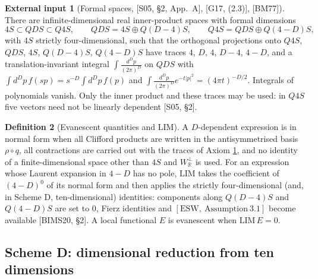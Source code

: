 \documentclass[11pt]{article}
\theoremstyle{definition}
\newtheorem{definition}{Definition}[section]
\newtheorem{axiom}[definition]{External input}
\numberwithin{equation}{section}
\begin{document}
\begin{axiom}[Formal spaces, {[S05, §2, App.~A], [G17, (2.3)], [BM77]}]
\label{ax:spaces}
There are infinite-dimensional real inner-product spaces with formal dimensions
\[
4S\subset QDS\subset Q4S,\qquad QDS=4S\oplus Q(D{-}4)S,\qquad Q4S=QDS\oplus Q(4{-}D)S,
\]
with $4S$ strictly four-dimensional, such that the orthogonal projections onto $Q4S$, $QDS$, $4S$, $Q(D{-}4)S$, $Q(4{-}D)S$ have traces $4$, $D$, $4$, $D-4$, $4-D$, and a translation-invariant integral $\int\frac{d^Dp}{(2\pi)^D}$ on $QDS$ with $\int d^Dp\,f(sp)=s^{-D}\int d^Dp\,f(p)$ and $\int\frac{d^Dp}{(2\pi)^D}e^{-t|p|^2}=(4\pi t)^{-D/2}$. Integrals of polynomials vanish. Only the inner product and these traces may be used: in $Q4S$ five vectors need not be linearly dependent [S05, §2].
\end{axiom}

\begin{definition}[Evanescent quantities and $\mathrm{LIM}$]
\label{def:lim}
A $D$-dependent expression is in normal form when all Clifford products are written in the antisymmetrised basis $\rho\circ q$, all contractions are carried out with the traces of Axiom \ref{ax:spaces}, and no identity of a finite-dimensional space other than $4S$ and $W^\perp_{\mathbb R}$ is used. For an expression whose Laurent expansion in $4-D$ has no pole, $\mathrm{LIM}$ takes the coefficient of $(4-D)^0$ of its normal form and then applies the strictly four-dimensional (and, in Scheme D, ten-dimensional) identities: components along $Q(D{-}4)S$ and $Q(4{-}D)S$ are set to $0$, Fierz identities and $[\mathrm{ESW},\ \mathrm{Assumption}\ 3.1]$ become available [BIMS20, §2]. A local functional $E$ is evanescent when $\mathrm{LIM}\,E=0$.
\end{definition}

\subsection{Scheme D: dimensional reduction from ten dimensions}
\end{document}
